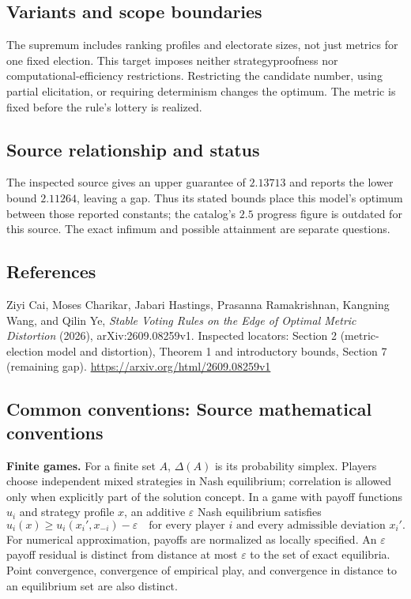 \documentclass[11pt,a4paper]{article}
\begin{document}
\subsection*{Variants and scope boundaries}
The supremum includes ranking profiles and electorate sizes, not just metrics for one fixed election. This target imposes neither strategyproofness nor computational-efficiency restrictions. Restricting the candidate number, using partial elicitation, or requiring determinism changes the optimum. The metric is fixed before the rule's lottery is realized.

\subsection*{Source relationship and status}
The inspected source gives an upper guarantee of $2.13713$ and reports the lower bound $2.11264$, leaving a gap. Thus its stated bounds place this model's optimum between those reported constants; the catalog's $2.5$ progress figure is outdated for this source. The exact infimum and possible attainment are separate questions.

\subsection*{References}
\begingroup\footnotesize\raggedright
\noindent [S1] Ziyi Cai, Moses Charikar, Jabari Hastings, Prasanna Ramakrishnan, Kangning Wang, and Qilin Ye, \emph{Stable Voting Rules on the Edge of Optimal Metric Distortion} (2026), arXiv:2609.08259v1. Inspected locators: Section 2 (metric-election model and distortion), Theorem 1 and introductory bounds, Section 7 (remaining gap).
\url{https://arxiv.org/html/2609.08259v1}
\par\endgroup

\subsection*{Common conventions: Source mathematical conventions}

\textbf{Finite games.} For a finite set $A$, $\Delta(A)$ is its probability
simplex. Players choose independent mixed strategies in Nash equilibrium;
correlation is allowed only when explicitly part of the solution concept.
In a game with payoff functions $u_i$ and strategy profile $x$, an additive
$\varepsilon$ Nash equilibrium satisfies
\[
 u_i(x)\geq u_i(x_i',x_{-i})-\varepsilon
 \quad\text{for every player $i$ and every admissible deviation $x_i'$}.
\]
For numerical approximation, payoffs are normalized as locally specified.
An $\varepsilon$ payoff residual is distinct from distance at most
$\varepsilon$ to the set of exact equilibria. Point convergence, convergence
of empirical play, and convergence in distance to an equilibrium set are
also distinct.
\end{document}
